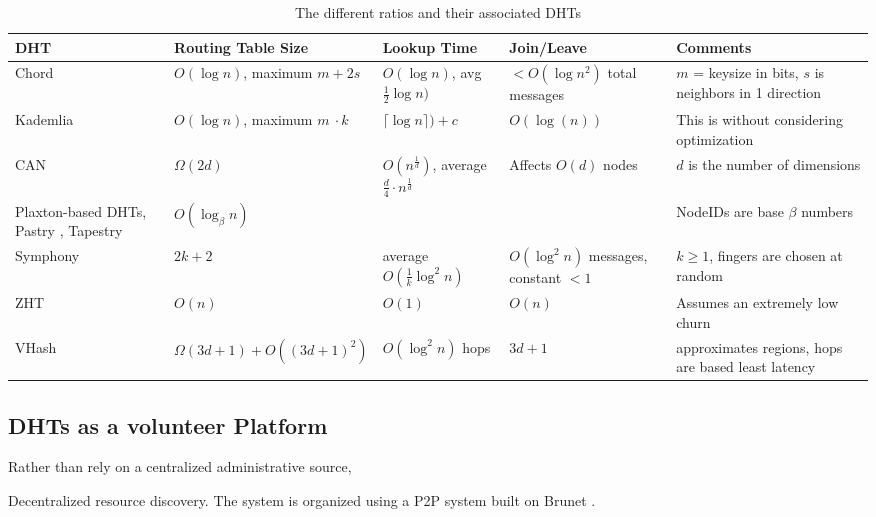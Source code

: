 \documentclass[10pt,letterpaper,twoside]{report}
\begin{document}
\begin{table}[h]
	\small
	\centering
	\begin{tabularx}{\textwidth}{ |X|X|X|X|X| }
		\hline
		DHT & Routing Table Size & Lookup Time & Join/Leave & Comments \\ \hline  
		
		Chord \cite{chord} & $O(\log n)$, maximum $m +2s$ & $O(\log n)$, avg $\frac{1}{2} \log n)$  &  $<O(\log n^{2})$ total messages& $m$  = keysize in bits, $s$ is neighbors in 1 direction  \\ \hline
		
		Kademlia \cite{kademlia} & $O(\log n)$, maximum $m\ \cdot k$ & $\lceil \log n\rceil) + c$ & $O(\log(n))$& This is without considering optimization   \\ \hline
		CAN \cite{can} & $\Omega(2d)$ & $O(n^{\frac{1}{d}})$, average $\frac{d}{4}\cdot n^{\frac{1}{d}}$ & Affects $O(d)$ nodes & $d$ is the number of dimensions \\ \hline
		
		Plaxton-based DHTs, Pastry \cite{pastry}, Tapestry \cite{tapestry} & $O(\log_{\beta} n)$ & & &  NodeIDs are base $\beta$ numbers \\ \hline
		
        Symphony \cite{symphony}& $2k + 2$&   average $O(\frac{1}{k} \log^{2} n )$ & $O(\log^{2} n)$ messages,  constant $<1$ &  $k \geq 1$, fingers are chosen at random\\ \hline  
		
        ZHT \cite{li2013zht}&   $O(n)$& $O(1)$ &  $O(n)$ & Assumes an extremely low churn \\ \hline
        
        VHash & $\Omega(3d+1) + O((3d+1)^{2})$ & $O(\log^{2}n)$ hops & $3d + 1$ & approximates regions, hops are based least latency\\ \hline
	\end{tabularx}
	\caption{The different ratios and their associated DHTs}
	\label{tab:tradeoffs}
\end{table}




\subsection{DHTs as a volunteer Platform}
Rather than rely on a centralized administrative source,


Decentralized resource discovery.
The system is organized using a P2P system built on Brunet \cite{brunet}.
\end{document}
